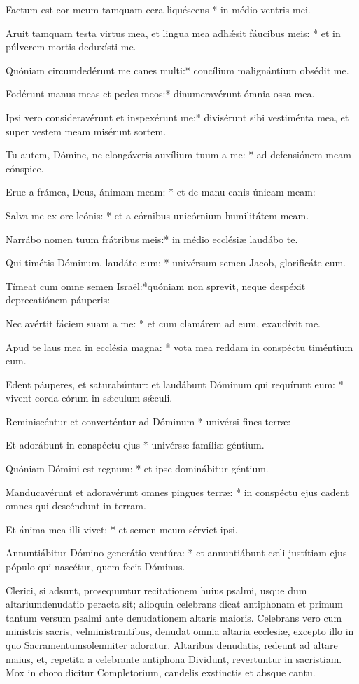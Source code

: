 Factum est cor meum tamquam cera liquéscens * in médio ventris mei.

{\color{blue!70}Aruit tamquam testa virtus mea, et lingua mea adhǽsit fáucibus meis: * et in
púlverem mortis deduxísti me.}

Quóniam circumdedérunt me canes multi:* concílium malignántium obsédit me.

{\color{blue!70}Fodérunt manus meas et pedes meos:* dinumeravérunt ómnia ossa mea.}

Ipsi vero consideravérunt et inspexérunt me:* divisérunt sibi vestiménta mea, et
super vestem meam misérunt sortem.

{\color{blue!70}Tu autem, Dómine, ne elongáveris auxílium tuum a me: * ad defensiónem meam
cónspice.}

Erue a frámea, Deus, ánimam meam: * et de manu canis únicam meam:

{\color{blue!70}Salva me ex ore leónis: * et a córnibus unicórnium humilitátem meam.}

Narrábo nomen tuum frátribus meis:* in médio ecclésiæ laudábo te.

{\color{blue!70}Qui timétis Dóminum, laudáte cum: * univérsum semen Jacob, glorificáte cum.}

Tímeat cum omne semen Israël:*quóniam non sprevit, neque despéxit deprecatiónem
páuperis:

{\color{blue!70}Nec avértit fáciem suam a me: * et cum clamárem ad eum, exaudívit me.}

Apud te laus mea in ecclésia magna: * vota mea reddam in conspéctu timéntium
eum.

{\color{blue!70}Edent páuperes, et saturabúntur: et laudábunt Dóminum qui requírunt eum: *
vivent corda eórum in sǽculum sǽculi.}

Reminiscéntur et converténtur ad Dóminum * univérsi fines terræ:

{\color{blue!70}Et adorábunt in conspéctu ejus * univérsæ famíliæ géntium.}

Quóniam Dómini est regnum: * et ipse dominábitur géntium.

{\color{blue!70}Manducavérunt et adoravérunt omnes pingues terræ: * in conspéctu ejus cadent
omnes qui descéndunt in terram.}

Et ánima mea illi vivet: * et semen meum sérviet ipsi.

{\color{blue!70}Annuntiábitur Dómino generátio ventúra: * et annuntiábunt cæli justítiam ejus
pópulo qui nascétur, quem fecit Dóminus.}

{\color{red} Clerici, si adsunt, prosequuntur recitationem huius psalmi, usque dum
altariumdenudatio peracta sit; alioquin celebrans dicat antiphonam et primum
tantum versum psalmi ante denudationem altaris maioris. Celebrans vero cum
ministris sacris, velministrantibus, denudat omnia altaria ecclesiæ, excepto
illo in quo Sacramentumsolemniter adoratur. Altaribus denudatis, redeunt ad
altare maius, et, repetita a celebrante antiphona Dividunt, revertuntur in
sacristiam. Mox in choro dicitur Completorium, candelis exstinctis et absque
cantu.}



